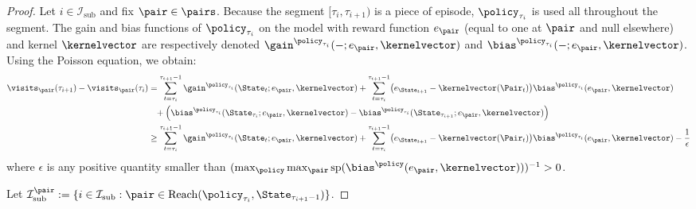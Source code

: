 \documentclass[preprint,cleveref,12pt]{colt2025}
\DeclarePairedDelimiter{\braces}{\{}{\}}	%
\DeclarePairedDelimiter{\parens}{(}{)}	%
\newcommand{\vecspan}[1]{\mathrm{sp}\parens{#1}}
\def\kernel{\kernelvector}
\def\Reach{\mathrm{Reach}}
\begin{document}
    \begin{proof}
        Let $i \in \mathcal{I}_\mathrm{sub}$ and fix $\pair \in \pairs$. 
        Because the segment $[\tau_i, \tau_{i+1})$ is a piece of episode, $\policy_{\tau_i}$ is used all throughout the segment. 
        The gain and bias functions of $\policy_{\tau_i}$ on the model with reward function $e_\pair$ (equal to one at $\pair$ and null elsewhere) and kernel $\kernel$ are respectively denoted $\gain^{\policy_{\tau_i}}(-; e_\pair, \kernel)$ and $\bias^{\policy_{\tau_i}}(-; e_\pair, \kernel)$. 
        Using the Poisson equation, we obtain:
        \begin{align*}
            \visits_\pair(\tau_{i+1}) - \visits_\pair(\tau_i) 
            & =
            \sum_{t=\tau_i}^{\tau_{i+1}-1}
            \gain^{\policy_{\tau_i}}(\State_t; e_\pair, \kernel)
            +
            \sum_{t=\tau_i}^{\tau_{i+1}-1}
            \parens*{
                e_{\State_{t+1}} - \kernel(\Pair_t)
            } \bias^{\policy_{\tau_i}}(e_\pair, \kernel)
            \\
            & \phantom{=}
            +
            \parens*{
                \bias^{\policy_{\tau_i}}(\State_{\tau_{i}}; e_\pair, \kernel)
                -
                \bias^{\policy_{\tau_i}}(\State_{\tau_{i+1}}; e_\pair, \kernel)
            }
            \\
            & \ge
            \sum_{t=\tau_i}^{\tau_{i+1}-1}
            \gain^{\policy_{\tau_i}}(\State_t; e_\pair, \kernel)
            +
            \sum_{t=\tau_i}^{\tau_{i+1}-1}
            \parens*{
                e_{\State_{t+1}} - \kernel(\Pair_t)
            } \bias^{\policy_{\tau_i}}(e_\pair, \kernel)
            - \frac 1\epsilon
        \end{align*}
        where $\epsilon$ is any positive quantity smaller than $(\max_\policy \max_\pair \vecspan{\bias^\policy(e_\pair, \kernel)})^{-1} > 0$. 

        Let $\mathcal{I}_\mathrm{sub}^\pair := \braces{i \in \mathcal{I}_\mathrm{sub}: \pair \in \Reach(\policy_{\tau_i}, \State_{\tau_{i+1}-1})}$.


\end{proof}
\end{document}
